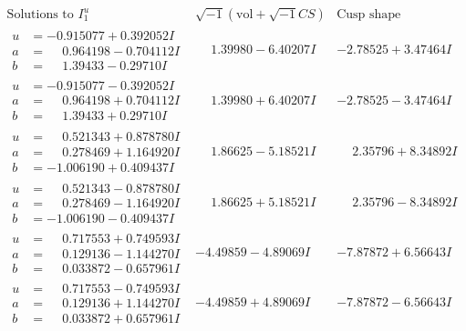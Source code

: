 \documentclass[1p]{elsarticle_modified}
\theoremstyle{definition}
\newcommand{\I}{\sqrt{-1}}
\begin{document}
$$\begin{array}{c|c|c}  
\text{Solutions to }I^u_{1}& \I (\text{vol} + \sqrt{-1}CS) & \text{Cusp shape}\\
 \hline 
\begin{aligned}
u &= -0.915077 + 0.392052 I \\
a &= \phantom{-}0.964198 - 0.704112 I \\
b &= \phantom{-}1.39433 - 0.29710 I\end{aligned}
 & \phantom{-}1.39980 - 6.40207 I & -2.78525 + 3.47464 I \\ \hline\begin{aligned}
u &= -0.915077 - 0.392052 I \\
a &= \phantom{-}0.964198 + 0.704112 I \\
b &= \phantom{-}1.39433 + 0.29710 I\end{aligned}
 & \phantom{-}1.39980 + 6.40207 I & -2.78525 - 3.47464 I \\ \hline\begin{aligned}
u &= \phantom{-}0.521343 + 0.878780 I \\
a &= \phantom{-}0.278469 + 1.164920 I \\
b &= -1.006190 + 0.409437 I\end{aligned}
 & \phantom{-}1.86625 - 5.18521 I & \phantom{-}2.35796 + 8.34892 I \\ \hline\begin{aligned}
u &= \phantom{-}0.521343 - 0.878780 I \\
a &= \phantom{-}0.278469 - 1.164920 I \\
b &= -1.006190 - 0.409437 I\end{aligned}
 & \phantom{-}1.86625 + 5.18521 I & \phantom{-}2.35796 - 8.34892 I \\ \hline\begin{aligned}
u &= \phantom{-}0.717553 + 0.749593 I \\
a &= \phantom{-}0.129136 - 1.144270 I \\
b &= \phantom{-}0.033872 - 0.657961 I\end{aligned}
 & -4.49859 - 4.89069 I & -7.87872 + 6.56643 I \\ \hline\begin{aligned}
u &= \phantom{-}0.717553 - 0.749593 I \\
a &= \phantom{-}0.129136 + 1.144270 I \\
b &= \phantom{-}0.033872 + 0.657961 I\end{aligned}
 & -4.49859 + 4.89069 I & -7.87872 - 6.56643 I \\ \hline\begin{aligned}

\end{aligned}
\end{array}$$
\end{document}
